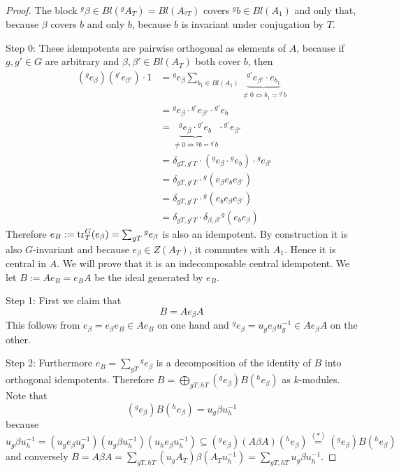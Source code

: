 \begin{proof}
The block ${^g \beta}\in Bl({^g A_T})=Bl(A_{^g T})$ covers ${^g b}\in Bl(A_1)$ and only that, because $\beta$ covers $b$ and only $b$, because $b$ is invariant under conjugation by $T$.

\medbreak
Step 0: These idempotents are pairwise orthogonal as elements of $A$, because if $g,g'\in G$ are arbitrary and $\beta,\beta'\in Bl(A_T)$ both cover $b$, then
\begin{align*}
(^g e_\beta)(^{g'} e_{\beta'}) \cdot 1 &= {^g e_\beta}\sum_{b_1\in Bl(A_1)} \underbrace{{^{g'} e_{\beta'}} \cdot e_{b_1}}_{\neq 0 \iff b_1={^{g'} b}} \\
&= {^g e_\beta} \cdot{^{g '} e_{\beta'}} \cdot {^{g'} e_b} \\
&= \underbrace{{^g e_\beta} \cdot {^{g'} e_b}}_{\neq 0 \iff {^g b}={^{g'} b}} \cdot{^{g'} e_{\beta'}} \\
&= \delta_{g T, g'T} \cdot ({^g e_\beta} \cdot {^g e_b}) \cdot {^g e_{\beta'}} \\
&= \delta_{g T, g'T} \cdot {^g(e_\beta e_b e_{\beta'})} \\
&= \delta_{g T, g'T} \cdot {^g(e_b e_\beta e_{\beta'})} \\
&= \delta_{g T, g'T} \cdot \delta_{\beta,\beta'} {^g(e_b e_\beta)}
\end{align*}
Therefore $e_B:=\operatorname{tr}_T^G(e_\beta) = \sum_{g T} {^g e_\beta}$ is also an idempotent. By construction it is also $G$-invariant and because $e_\beta\in Z(A_T)$, it commutes with $A_1$. Hence it is central in $A$. We will prove that it is an indecomposable central idempotent. We let $B:=Ae_B = e_B A$ be the ideal generated by $e_B$.

\smallbreak
Step 1: First we claim that
\begin{equation}\label{fong_reynolds:B_equals_A_beta_A}
B=Ae_\beta A \tag{$\ast$}
\end{equation}
This follows from $e_\beta = e_\beta e_B \in A e_B$ on one hand and ${^g e_\beta} =u_g e_\beta u_g^{-1} \in A e_\beta A$ on the other.

\smallbreak
Step 2: Furthermore $e_B = \sum_{g T} {^g e_\beta}$ is a decomposition of the identity of $B$ into orthogonal idempotents. Therefore $B=\bigoplus_{gT,hT} ({^g e_\beta})B({^h e_\beta})$ as $k$-modules. Note that
\begin{equation}\label{fong_reynolds:corners_of_B}
({^g e_\beta}) B ({^h e_\beta}) = u_g \beta u_h^{-1} \tag{$\ast\ast$}
\end{equation}
because $u_g \beta u_h^{-1} = (u_g e_\beta u_g^{-1})(u_g\beta u_h^{-1})(u_he_\beta u_h^{-1}) \subseteq ({^g e_\beta})(A\beta A)({^h e_\beta}) \overset{(\ast)}{=} ({^g e_\beta})B({^h e_\beta})$ and conversely $B=A\beta A = \sum_{gT,hT} (u_g A_T)\beta(A_T u_h^{-1}) = \sum_{gT,hT} u_g \beta u_h^{-1}$.


\end{proof}
